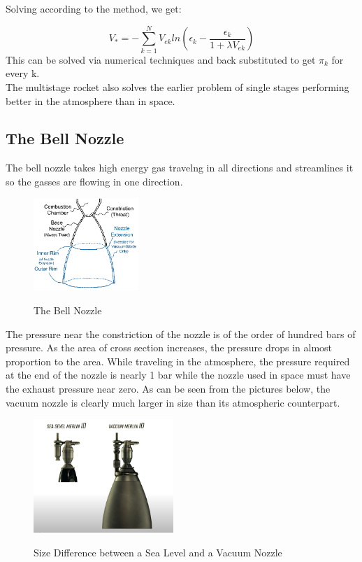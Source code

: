 \documentclass[12pt, letterpaper]{article}
\begin{document}
Solving according to the method, we get:

\[
	V_* = - \sum_{k=1}^{N} V_{ek} ln\left( \epsilon_k - \frac{\epsilon_k}{1 + \lambda V_{ek}} \right)
\]
This can be solved via numerical techniques and back substituted to get $\pi_k$ for every k.\\

The multistage rocket also solves the earlier problem of single stages performing better in the atmosphere than in space. 
\newpage
\subsection{The Bell Nozzle}
The bell nozzle takes high energy gas travelng in all directions and streamlines it so the gasses are flowing in one direction.

\begin{figure}[ht]
	\centering
    \includegraphics[width = 150px]{nozzle}
    \label{fig:nozzle}
    \caption{The Bell Nozzle}
\end{figure}

The pressure near the constriction of the nozzle is of the order of hundred bars of pressure. As the area of cross section increases, the pressure drops in almost proportion to the area. While traveling in the atmosphere, the pressure required at the end of the nozzle is nearly 1 bar while the nozzle used in space must have the exhaust pressure near zero. As can be seen from the pictures below, the vacuum nozzle is clearly much larger in size than its atmospheric counterpart.

\begin{figure}[ht]
	\centering
    \includegraphics[width = 200px]{comp}
    \label{fig:comp}
    \caption{Size Difference between a Sea Level and a Vacuum Nozzle}
\end{figure}
\end{document}
